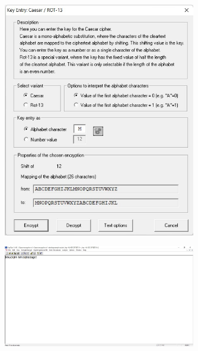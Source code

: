 \documentclass{article}
\begin{document}
\begin{figure}[H]
    \centering
    \includegraphics[width=0.75\textwidth]{figures/1b.jpg}
    \caption
	{}
    \label{fig:fig1}
\end{figure}

\begin{figure}[H]
    \centering
    \includegraphics[width=0.75\textwidth]{figures/1c.jpg}
    \caption
	{}
    \label{fig:fig1}
\end{figure}
\end{document}
